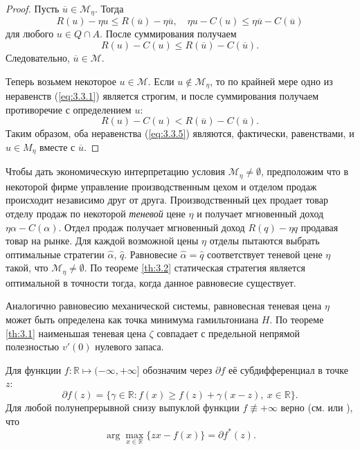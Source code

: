 \begin{proof}
Пусть $\overline u\in\mathscr M_\eta$. Тогда
\begin{equation} \label{eq:3.3.5}
 R(u)-\eta u\le R(\overline u)-\eta \overline u,\quad \eta u-C(u)\le \eta\overline u-C(\overline u)
\end{equation}
для любого $u\in Q\cap A$. После суммирования получаем
$$ R(u)-C(u)\le R(\overline u)-C(\overline u).$$
Следовательно, $\overline u\in\mathscr M$.

Теперь возьмем некоторое $u\in\mathscr M$. Если $u\not\in\mathscr M_\eta$, то по крайней мере одно из неравенств (\ref{eq:3.3.1}) является строгим, и после суммирования получаем противоречие с определением $u$:
$$  R(u)-C(u)< R(\overline u)-C(\overline u).$$
Таким образом, оба неравенства (\ref{eq:3.3.5}) являются, фактически, равенствами, и $u\in M_\eta$ вместе с $\overline u$.
\end{proof}

Чтобы дать экономическую интерпретацию условия $\mathscr M_\eta\neq\emptyset$, предположим что в некоторой фирме управление производственным цехом и отделом продаж происходит независимо друг от друга. Производственный цех продает товар отделу продаж  по некоторой \emph{теневой} цене $\eta$ и получает мгновенный доход $\eta\alpha-C(\alpha)$. Отдел продаж получает мгновенный доход $R(q)-\eta q$ продавая товар на рынке. Для каждой возможной цены $\eta$ отделы пытаются выбрать оптимальные стратегии $\widehat\alpha$, $\widehat q$. Равновесие $\widehat\alpha=\widehat q$  соответствует теневой цене $\eta$ такой, что $\mathscr M_\eta\neq\emptyset$. По теореме \ref{th:3.2} статическая стратегия является оптимальной в точности тогда, когда данное равновесие существует.

Аналогично равновесию механической системы, равновесная теневая цена $\eta$ может быть определена как точка минимума гамильтониана $H$. По теореме \ref{th:3.1} наименьшая теневая цена $\zeta$ совпадает с предельной непрямой полезностью $v'(0)$ нулевого запаса.

Для функции $f:\mathbb R\mapsto (-\infty,+\infty]$ обозначим через $\partial f$ её субдифференциал в точке $z$:
$$ \partial f(z)=\{\gamma\in\mathbb R: f(x)\ge f(z)+\gamma (x-z),\ x\in\mathbb R\}.$$
Для любой полунепрерывной снизу выпуклой функции $f\not\equiv +\infty$ верно (см. \cite[теорема 23.5]{Roc70} или \cite[предложение 11.3]{RockWets09}), что
\begin{equation} \label{eq:3.3.6}
\arg\max_{x\in\mathbb R}\{zx-f(x)\}=\partial f^*(z).
\end{equation}

